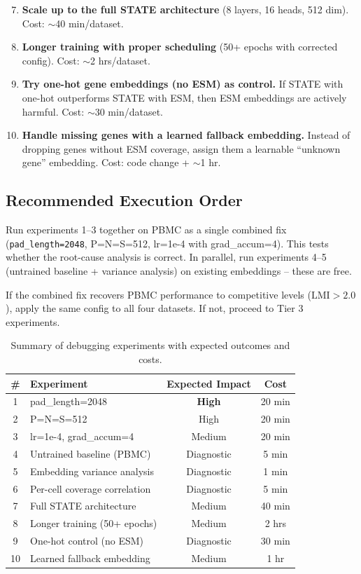 \documentclass[11pt,a4paper]{article}
\begin{document}
\begin{enumerate}
    \setcounter{enumi}{6}

    \item \textbf{Scale up to the full STATE architecture} (8 layers, 16 heads, 512 dim). Cost: $\sim$40 min/dataset.

    \item \textbf{Longer training with proper scheduling} (50+ epochs with corrected config). Cost: $\sim$2 hrs/dataset.

    \item \textbf{Try one-hot gene embeddings (no ESM) as control.} If STATE with one-hot outperforms STATE with ESM, then ESM embeddings are actively harmful. Cost: $\sim$30 min/dataset.

    \item \textbf{Handle missing genes with a learned fallback embedding.} Instead of dropping genes without ESM coverage, assign them a learnable ``unknown gene'' embedding. Cost: code change + $\sim$1 hr.
\end{enumerate}

\subsection{Recommended Execution Order}

Run experiments 1--3 together on PBMC as a single combined fix (\texttt{pad\_length=2048}, P=N=S=512, lr=1e-4 with grad\_accum=4). This tests whether the root-cause analysis is correct. In parallel, run experiments 4--5 (untrained baseline + variance analysis) on existing embeddings -- these are free.

If the combined fix recovers PBMC performance to competitive levels ($\text{LMI} > 2.0$), apply the same config to all four datasets. If not, proceed to Tier 3 experiments.

\begin{table}[H]
\centering
\caption{Summary of debugging experiments with expected outcomes and costs.}
\label{tab:debug_plan}
\begin{tabular}{clcc}
\toprule
\# & Experiment & Expected Impact & Cost \\
\midrule
1 & pad\_length=2048 & \textbf{High} & 20 min \\
2 & P=N=S=512 & High & 20 min \\
3 & lr=1e-4, grad\_accum=4 & Medium & 20 min \\
4 & Untrained baseline (PBMC) & Diagnostic & 5 min \\
5 & Embedding variance analysis & Diagnostic & 1 min \\
6 & Per-cell coverage correlation & Diagnostic & 5 min \\
7 & Full STATE architecture & Medium & 40 min \\
8 & Longer training (50+ epochs) & Medium & 2 hrs \\
9 & One-hot control (no ESM) & Diagnostic & 30 min \\
10 & Learned fallback embedding & Medium & 1 hr \\
\bottomrule
\end{tabular}
\end{table}
\end{document}
